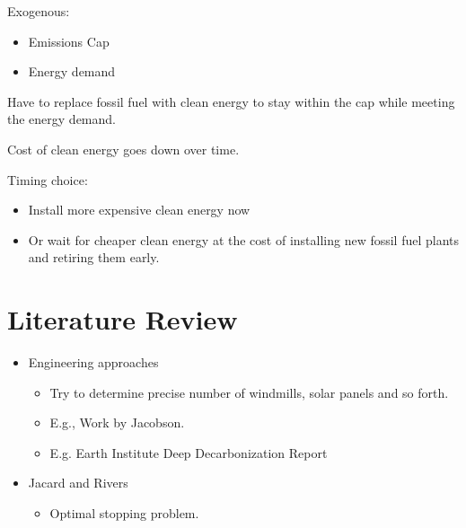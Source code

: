 \documentclass[singlespace]{easychithesis}
\begin{document}
Exogenous:

	\begin{itemize}
    
    	\item{Emissions Cap}
        \item{Energy demand}

	\end{itemize}


Have to replace fossil fuel with clean energy to stay within the cap while meeting the energy demand.

Cost of clean energy goes down over time. 

Timing choice: 

  \begin{itemize}

	\item{Install more expensive clean energy now}
	\item{Or wait for cheaper clean energy at the cost of installing new fossil fuel plants and retiring them early.}

\end{itemize}



\section{Literature Review}

\begin{itemize}
\item Engineering approaches

\begin{itemize}
\item Try to determine precise number of windmills, solar panels and so
forth.

\item E.g., Work by Jacobson.

\item E.g. Earth Institute Deep Decarbonization Report
\end{itemize}

\item Jacard and Rivers

\begin{itemize}
\item Optimal stopping problem.
\end{itemize}
\end{itemize}
\end{document}
